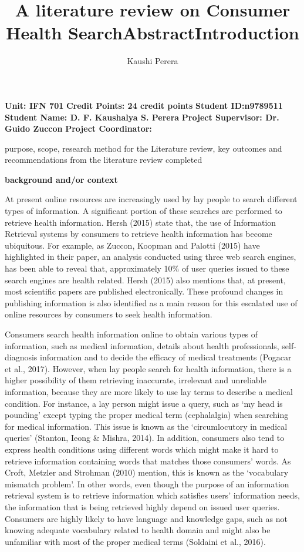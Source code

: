 \documentclass[]{article}
\title{A literature review on Consumer Health Search}
\author{Kaushi Perera}
\begin{document}
	
\maketitle
	
\textbf{Unit: IFN 701}
\textbf{Credit Points: 24 credit points}	
\textbf{Student ID:n9789511}	
\textbf{Student Name: D. F. Kaushalya S. Perera}	
\textbf{Project Supervisor: Dr. Guido Zuccon}	
\textbf{Project Coordinator: }		
	
\title{Abstract}

purpose, 
scope, 
research method for the Literature review, 
key outcomes and 
recommendations from the literature review completed

\title{Introduction}    

\textbf{background and/or context}

At present online resources are increasingly used by lay people to search different types of information. A significant portion of these searches are performed to retrieve health information. Hersh (2015) state that, the use of Information Retrieval systems by consumers to retrieve health information has become ubiquitous. For example, as Zuccon, Koopman and Palotti (2015) have highlighted in their paper, an analysis conducted using three web search engines, has been able to reveal that, approximately 10\% of user queries issued to these search engines are health related.  Hersh (2015) also mentions that, at present, most scientific papers are published electronically. These profound changes in publishing information is also identified as a main reason for this escalated use of online resources by consumers to seek health information.  

Consumers search health information online to obtain various types of information, such as medical information, details about health professionals, self-diagnosis information and to decide the efficacy of medical treatments (Pogacar et al., 2017). However, when lay people search for health information, there is a higher possibility of them retrieving inaccurate, irrelevant and unreliable information, because they are more likely to use lay terms to describe a medical condition. For instance, a lay person might issue a query, such as ‘my head is pounding’ except typing the proper medical term (cephalalgia) when searching for medical information. This issue is known as the ‘circumlocutory in medical queries’ (Stanton, Ieong \& Mishra, 2014). In addition, consumers also tend to express health conditions using different words which might make it hard to retrieve information containing words that matches those consumers’ words. As Croft, Metzler and Strohman (2010) mention, this is known as the ‘vocabulary mismatch problem’. In other words, even though the purpose of an information retrieval system is to retrieve information which satisfies users’ information needs, the information that is being retrieved highly depend on issued user queries. Consumers are highly likely to have language and knowledge gaps, such as not knowing adequate vocabulary related to health domain and might also be unfamiliar with most of the proper medical terms (Soldaini et al., 2016). 
   
\end{document}
